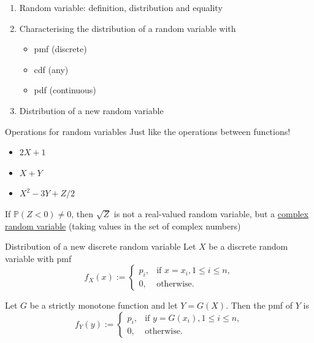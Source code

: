 \documentclass{beamer}
\begin{document}
\begin{frame}
\begin{enumerate}
\item Random variable: definition, distribution and equality 
\item Characterising the distribution of a random variable with
\begin{itemize}
\item pmf (discrete)
\item cdf (any)
\item pdf (continuous)
\end{itemize}
\item Distribution of a new random variable
\end{enumerate}
\end{frame}




\begin{frame}{Operations for random variables}
Just like the operations between functions! 
\begin{itemize}
\item $2X+1$
\item $X+Y$
\item $X^2-3Y+Z/2$
\end{itemize}
If $\mathbb P(Z<0)\neq 0$, then $\sqrt{Z}$ is not a real-valued random variable, but a \underline{complex random variable} (taking values in the set of complex numbers)
\end{frame}

\begin{frame}{Distribution of a new discrete random variable}
Let $X$ be a discrete random variable with pmf 
$$f_X(x):=\begin{cases}
p_i,&\text{if }x=x_i, 1\leq i\leq n,\\
0,& \text{otherwise.}
\end{cases}$$


Let $G$ be a strictly monotone function and let $Y=G(X)$. Then the pmf of $Y$ is 
$$f_Y(y):=\begin{cases}
p_i,&\text{if }y=G(x_i), 1\leq i\leq n,\\
0,& \text{otherwise.}
\end{cases}$$

\end{frame}
\end{document}
